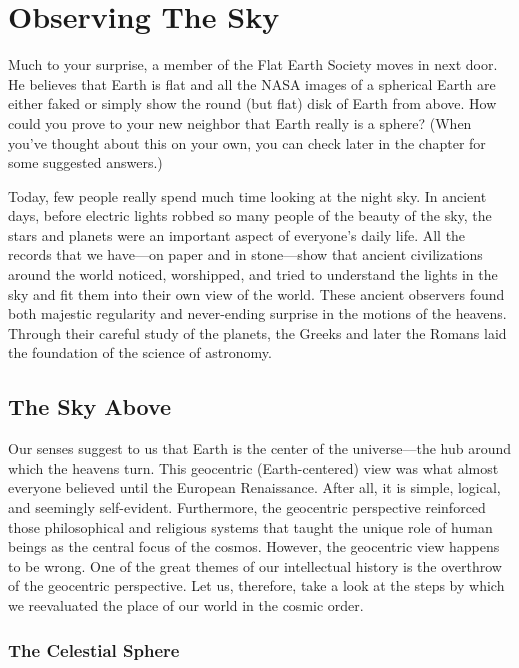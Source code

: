 \documentclass[../../main-astronomy.tex]{subfiles}
\begin{document}
\section{Observing The Sky}

Much to your surprise, a member of the Flat Earth Society moves in next door. He believes that Earth is flat and all the NASA images of a spherical Earth are either faked or simply show the round (but flat) disk of Earth from above. How could you prove to your new neighbor that Earth really is a sphere? (When you've thought about this on your own, you can check later in the chapter for some suggested answers.)

\vspace{1em}

Today, few people really spend much time looking at the night sky. In ancient days, before electric lights robbed so many people of the beauty of the sky, the stars and planets were an important aspect of everyone's daily life. All the records that we have---on paper and in stone---show that ancient civilizations around the world noticed, worshipped, and tried to understand the lights in the sky and fit them into their own view of the world. These ancient observers found both majestic regularity and never-ending surprise in the motions of the heavens. Through their careful study of the planets, the Greeks and later the Romans laid the foundation of the science of astronomy.

\subsection{The Sky Above}

Our senses suggest to us that Earth is the center of the universe---the hub around which the heavens turn. This \gls{geocentric} (Earth-centered) view was what almost everyone believed until the European Renaissance. After all, it is simple, logical, and seemingly self-evident. Furthermore, the geocentric perspective reinforced those philosophical and religious systems that taught the unique role of human beings as the central focus of the cosmos. However, the geocentric view happens to be wrong. One of the great themes of our intellectual history is the overthrow of the geocentric perspective. Let us, therefore, take a look at the steps by which we reevaluated the place of our world in the cosmic order.

\subsubsection*{The Celestial Sphere}
\end{document}
